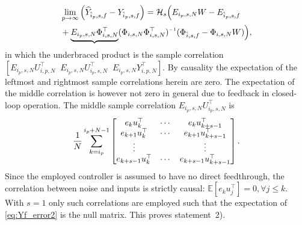 \begin{align}\label{eq:Yf_error2}
    \begin{split}
        &\lim_{p\rightarrow\infty} \Big( \widehat{Y}_{\hat{i}_p,s,f}-Y_{\hat{i}_p,s,f} \Big)=\mathcal{H}_s\Big(E_{i_p,s,N}W-E_{\hat{i}_p,s,f} \\
        &+\underbrace{E_{i_p,s,N}\Phi_{i,s,N}^\top}(\Phi_{i,s,N}\Phi_{i,s,N}^\top)\inv(\Phi_{\hat{i},s,f}-\Phi_{i,s,N}W)\Big),
    \end{split}
\end{align}
in which the underbraced product is the sample correlation $[E_{i_p,s,N}U_{i,p,N}^\top\;\;E_{i_p,s,N}U_{i_p,s,N}^\top\;\;E_{i_p,s,N}Y_{i,p,N}^\top]$. By causality the expectation of the leftmost and rightmost sample correlations herein are zero. The expectation of the middle correlation is however not zero in general due to feedback in closed-loop operation. The middle sample correlation $E_{i_p,s,N}U_{i_p,s,N}^\top$ is
\begin{align}
    \frac{1}{N}\sum\limits_{k=i_p}^{i_p+N-1}\begin{bmatrix}
        e_k u_k^\top & \cdots & e_k u_{k+s-1}^\top\\
        e_{k+1} u_k^\top & \cdots & e_{k+1} u_{k+s-1}^\top\\
        \vdots &  & \vdots\\
        e_{k+s-1}u_k^\top & \cdots & e_{k+s-1}u_{k+s-1}^\top
    \end{bmatrix}.\notag%
\end{align}
Since the employed controller is assumed to have no direct feedthrough, the correlation between noise and inputs is strictly causal: $\mathbb{E}[e_ku_j^\top]=0,\forall{j\leq k}$. With $s=1$ only such correlations are employed such that the expectation of \eqref{eq:Yf_error2} is the null matrix. This proves statement~2).
%
%
%
